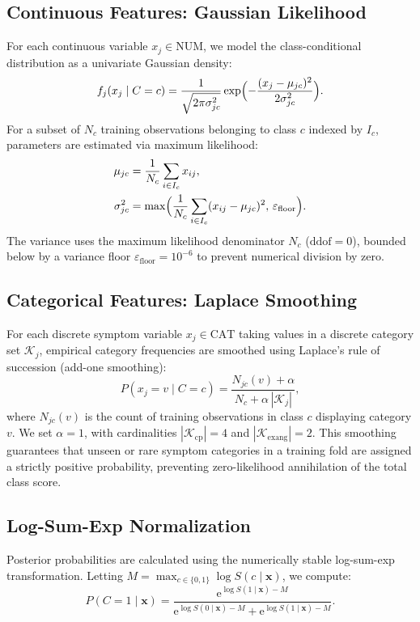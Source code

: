 \documentclass[conference]{IEEEtran}
\begin{document}
\subsection{Continuous Features: Gaussian Likelihood}
For each continuous variable $x_j\in\mathrm{NUM}$, we model the class-conditional distribution as a univariate Gaussian density:
\begin{equation}
f_j(x_j\mid C=c)
=\frac{1}{\sqrt{2\pi\sigma_{jc}^{2}}}
\exp\Bigl(-\frac{(x_j-\mu_{jc})^{2}}{2\sigma_{jc}^{2}}\Bigr).
\end{equation}
For a subset of $N_c$ training observations belonging to class $c$ indexed by $I_c$, parameters are estimated via maximum likelihood:
\begin{align}
\mu_{jc}&=\frac{1}{N_c}\sum_{i\in I_c}x_{ij},\\
\sigma_{jc}^{2}&=\max\Bigl(\frac{1}{N_c}\sum_{i\in I_c}(x_{ij}-\mu_{jc})^{2},\,\varepsilon_{\mathrm{floor}}\Bigr).
\end{align}
The variance uses the maximum likelihood denominator $N_c$ ($\mathrm{ddof}=0$), bounded below by a variance floor $\varepsilon_{\mathrm{floor}}=10^{-6}$ to prevent numerical division by zero.

\subsection{Categorical Features: Laplace Smoothing}
For each discrete symptom variable $x_j\in\mathrm{CAT}$ taking values in a discrete category set $\mathcal{K}_j$, empirical category frequencies are smoothed using Laplace's rule of succession (add-one smoothing):
\begin{equation}
P(x_j=v\mid C=c)
=\frac{N_{jc}(v)+\alpha}{N_c+\alpha\,|\mathcal{K}_j|},
\end{equation}
where $N_{jc}(v)$ is the count of training observations in class $c$ displaying category $v$. We set $\alpha=1$, with cardinalities $|\mathcal{K}_{\text{cp}}|=4$ and $|\mathcal{K}_{\text{exang}}|=2$. This smoothing guarantees that unseen or rare symptom categories in a training fold are assigned a strictly positive probability, preventing zero-likelihood annihilation of the total class score.

\subsection{Log-Sum-Exp Normalization}
Posterior probabilities are calculated using the numerically stable log-sum-exp transformation. Letting $M=\max_{c\in\{0,1\}}\log S(c\mid\mathbf{x})$, we compute:
\begin{equation}
P(C=1\mid\mathbf{x})
=\frac{\mathrm{e}^{\log S(1\mid\mathbf{x})-M}}
{\mathrm{e}^{\log S(0\mid\mathbf{x})-M}+\mathrm{e}^{\log S(1\mid\mathbf{x})-M}}.
\end{equation}
\end{document}
